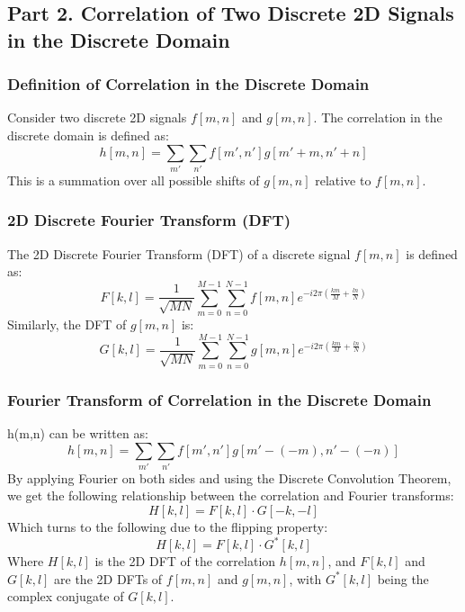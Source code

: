 \documentclass{article}
\begin{document}

\subsection*{Part 2. Correlation of Two Discrete 2D Signals in the Discrete Domain}

\subsubsection*{Definition of Correlation in the Discrete Domain}
Consider two discrete 2D signals $f[m, n]$ and $g[m, n]$. The correlation in the discrete domain is defined as:
\[
h[m, n] = \sum_{m'} \sum_{n'} f[m', n'] g[m' + m, n' + n]
\]
This is a summation over all possible shifts of $g[m, n]$ relative to $f[m, n]$.

\subsubsection*{2D Discrete Fourier Transform (DFT)}
The 2D Discrete Fourier Transform (DFT) of a discrete signal $f[m, n]$ is defined as:
\[
F[k, l] = \frac{1}{\sqrt{MN}} \sum_{m=0}^{M-1} \sum_{n=0}^{N-1} f[m, n] e^{-i 2\pi \left( \frac{km}{M} + \frac{ln}{N} \right)}
\]
Similarly, the DFT of $g[m, n]$ is:
\[
G[k, l] = \frac{1}{\sqrt{MN}} \sum_{m=0}^{M-1} \sum_{n=0}^{N-1} g[m, n] e^{-i 2\pi \left( \frac{km}{M} + \frac{ln}{N} \right)}
\]

\subsubsection*{Fourier Transform of Correlation in the Discrete Domain}
h(m,n) can be written as:
\[
h[m, n] = \sum_{m'} \sum_{n'} f[m', n'] g[m' - (-m), n' - (-n)]
\]
By applying Fourier on both sides and using the Discrete Convolution Theorem, we get the following relationship between the correlation and Fourier transforms:
\[
H[k, l] = F[k, l] \cdot G[-k, -l]
\]
Which turns to the following due to the flipping property:
\[
H[k, l] = F[k, l] \cdot G^*[k, l]
\]
Where $H[k, l]$ is the 2D DFT of the correlation $h[m, n]$, and $F[k, l]$ and $G[k, l]$ are the 2D DFTs of $f[m, n]$ and $g[m, n]$, with $G^*[k, l]$ being the complex conjugate of $G[k, l]$.
\end{document}
